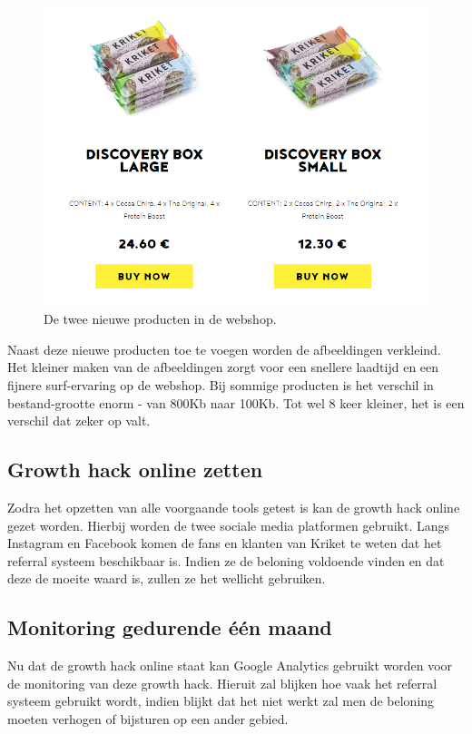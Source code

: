 \begin{figure}[h!]
	\includegraphics[width=\linewidth]{img/discovery-box-webshop.png}
	\caption{De twee nieuwe producten in de webshop.}
	\label{fig:discovery-box-webshop}
\end{figure}

Naast deze nieuwe producten toe te voegen worden de afbeeldingen verkleind. Het kleiner maken van de afbeeldingen zorgt voor een snellere laadtijd en een fijnere surf-ervaring op de webshop. Bij sommige producten is het verschil in bestand-grootte enorm - van 800Kb naar 100Kb. Tot wel 8 keer kleiner, het is een verschil dat zeker op valt.

\subsection{Growth hack online zetten} \label{sec:growth-hack-online-zetten}
Zodra het opzetten van alle voorgaande tools getest is kan de growth hack online gezet worden. Hierbij worden de twee sociale media platformen gebruikt. Langs Instagram en Facebook komen de fans en klanten van Kriket te weten dat het referral systeem beschikbaar is. Indien ze de beloning voldoende vinden en dat deze de moeite waard is, zullen ze het wellicht gebruiken. 

\subsection{Monitoring gedurende één maand} \label{sec:monitoring-gedurende-twee-weken}
Nu dat de growth hack online staat kan Google Analytics gebruikt worden voor de monitoring van deze growth hack. Hieruit zal blijken hoe vaak het referral systeem gebruikt wordt, indien blijkt dat het niet werkt zal men de beloning moeten verhogen of bijsturen op een ander gebied.

